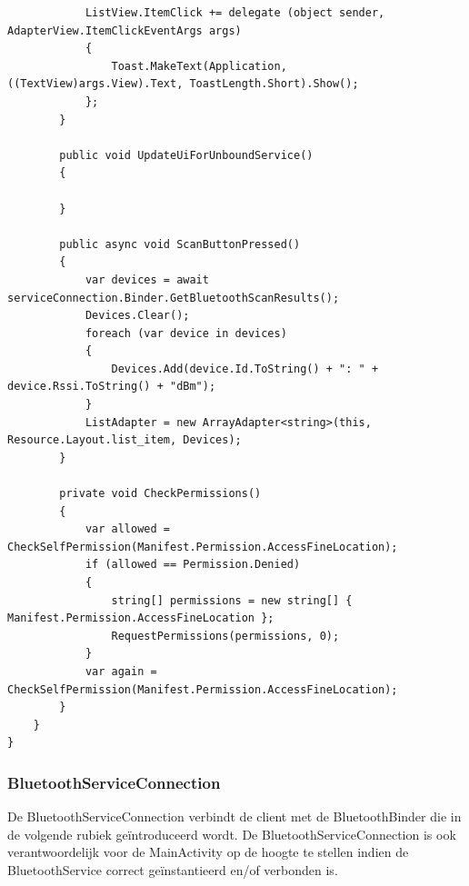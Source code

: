 \begin{lstlisting}
            ListView.ItemClick += delegate (object sender, AdapterView.ItemClickEventArgs args)
            {
                Toast.MakeText(Application, ((TextView)args.View).Text, ToastLength.Short).Show();
            };
        }
        
        public void UpdateUiForUnboundService()
        {
            
        }
        
        public async void ScanButtonPressed()
        {
            var devices = await serviceConnection.Binder.GetBluetoothScanResults();
            Devices.Clear();
            foreach (var device in devices)
            {
                Devices.Add(device.Id.ToString() + ": " + device.Rssi.ToString() + "dBm");
            }
            ListAdapter = new ArrayAdapter<string>(this, Resource.Layout.list_item, Devices);
        }
        
        private void CheckPermissions()
        {
            var allowed = CheckSelfPermission(Manifest.Permission.AccessFineLocation);
            if (allowed == Permission.Denied)
            {
                string[] permissions = new string[] { Manifest.Permission.AccessFineLocation };
                RequestPermissions(permissions, 0);
            }
            var again = CheckSelfPermission(Manifest.Permission.AccessFineLocation);
        }
    }
}
\end{lstlisting}
\subsubsection{BluetoothServiceConnection}
De BluetoothServiceConnection verbindt de client met de BluetoothBinder die in de volgende rubiek geïntroduceerd wordt. De BluetoothServiceConnection is ook verantwoordelijk voor de MainActivity op de hoogte te stellen indien de BluetoothService correct geïnstantieerd en/of verbonden is.

